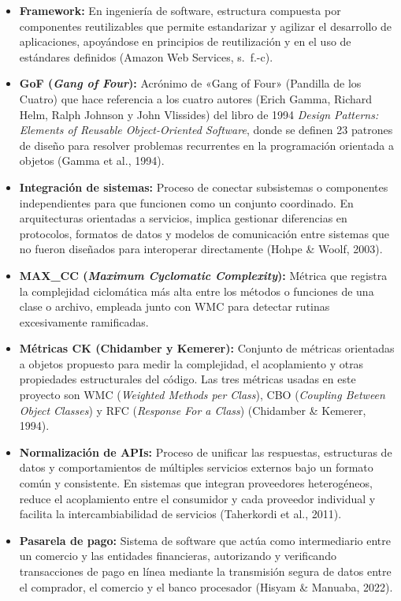 \begin{itemize}
  \item \textbf{Framework:} En ingeniería de software, estructura compuesta por componentes reutilizables que permite estandarizar y agilizar el desarrollo de aplicaciones, apoyándose en principios de reutilización y en el uso de estándares definidos (Amazon Web Services, s.~f.-c).
  \item \textbf{GoF (\textit{Gang of Four}):} Acrónimo de «Gang of Four» (Pandilla de los Cuatro) que hace referencia a los cuatro autores (Erich Gamma, Richard Helm, Ralph Johnson y John Vlissides) del libro de 1994 \textit{Design Patterns: Elements of Reusable Object-Oriented Software}, donde se definen 23 patrones de diseño para resolver problemas recurrentes en la programación orientada a objetos (Gamma et al., 1994).
  \item \textbf{Integración de sistemas:} Proceso de conectar subsistemas o componentes independientes para que funcionen como un conjunto coordinado. En arquitecturas orientadas a servicios, implica gestionar diferencias en protocolos, formatos de datos y modelos de comunicación entre sistemas que no fueron diseñados para interoperar directamente (Hohpe \& Woolf, 2003).
  \item \textbf{MAX\_CC (\textit{Maximum Cyclomatic Complexity}):} Métrica que registra la complejidad ciclomática más alta entre los métodos o funciones de una clase o archivo, empleada junto con WMC para detectar rutinas excesivamente ramificadas.
  \item \textbf{Métricas CK (Chidamber y Kemerer):} Conjunto de métricas orientadas a objetos propuesto para medir la complejidad, el acoplamiento y otras propiedades estructurales del código. Las tres métricas usadas en este proyecto son WMC (\textit{Weighted Methods per Class}), CBO (\textit{Coupling Between Object Classes}) y RFC (\textit{Response For a Class}) (Chidamber \& Kemerer, 1994).
  \item \textbf{Normalización de APIs:} Proceso de unificar las respuestas, estructuras de datos y comportamientos de múltiples servicios externos bajo un formato común y consistente. En sistemas que integran proveedores heterogéneos, reduce el acoplamiento entre el consumidor y cada proveedor individual y facilita la intercambiabilidad de servicios (Taherkordi et al., 2011).
  \item \textbf{Pasarela de pago:} Sistema de software que actúa como intermediario entre un comercio y las entidades financieras, autorizando y verificando transacciones de pago en línea mediante la transmisión segura de datos entre el comprador, el comercio y el banco procesador (Hisyam \& Manuaba, 2022).

\end{itemize}
